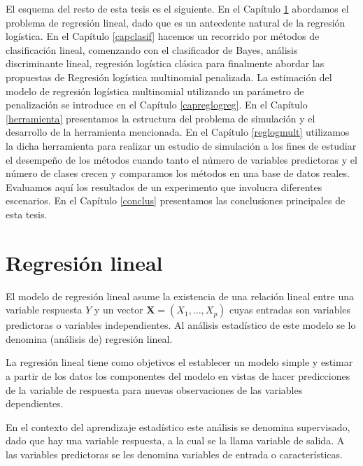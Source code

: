 \documentclass{report}
\begin{document}
El esquema del resto de esta tesis es el siguiente. En el Capítulo \ref{reglineal} abordamos el problema de regresión lineal,  dado que  es un antecdente natural de la regresión logística. En el Capítulo \ref{capclasif} hacemos un recorrido por métodos de clasificación lineal, comenzando con el clasificador de Bayes,  análisis discriminante lineal,  regresión logística clásica para finalmente abordar las propuestas de Regresión logística multinomial penalizada.    La estimación del modelo de regresión logística multinomial utilizando un parámetro de penalización se introduce en el Capítulo \ref{capreglogreg}.   En el Capítulo \ref{herramienta} presentamos la estructura del problema de simulación y el desarrollo de la herramienta mencionada. En el Capítulo \ref{reglogmult}  utilizamos la dicha herramienta para realizar un estudio de simulación    a los fines de estudiar el desempeño de los métodos cuando tanto el número de variables predictoras  y el número de clases  crecen y comparamos los métodos en una base de datos reales.  Evaluamos aquí los resultados de un experimento que involucra diferentes escenarios. En el Capítulo \ref{conclus} presentamos las conclusiones principales de esta tesis.


 







\chapter{Regresión lineal}\label{reglineal}


 El modelo de regresión lineal asume la existencia de una relación lineal entre una variable respuesta $Y$ y  un vector $\mathbf{X}=(X_1, \ldots, X_p)$ cuyas entradas son variables predictoras o variables independientes. Al  análisis estadístico de este modelo se lo denomina  (análisis de) regresión lineal. 
 
 La regresión lineal tiene como objetivos el establecer un modelo simple y  estimar a partir de los datos los componentes del modelo en vistas de hacer predicciones de la variable de respuesta para nuevas observaciones de las variables dependientes. 
 
 En el contexto del aprendizaje estadístico este análisis se denomina supervisado, dado que hay una variable respuesta, a la cual se la llama variable de salida. A las variables predictoras se les denomina  variables de entrada o características. 
 
\end{document}
